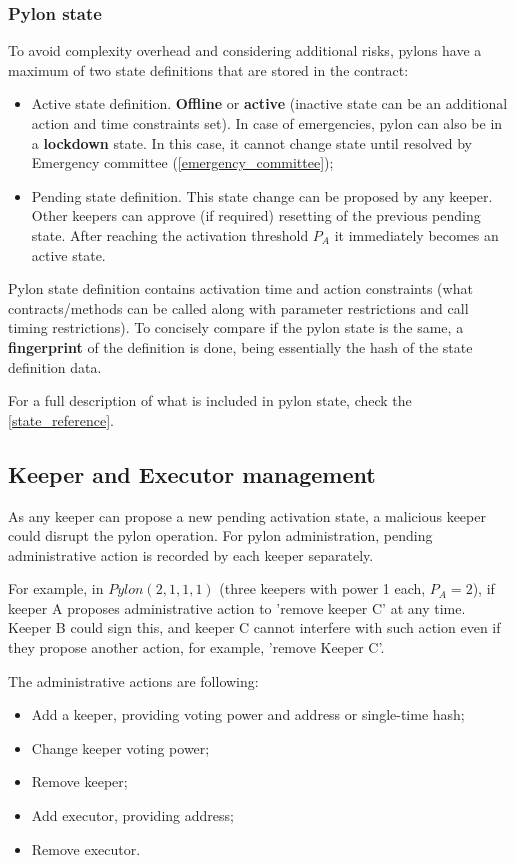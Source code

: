 \documentclass[12pt]{article}
\begin{document}
\subsubsection{Pylon state}

To avoid complexity overhead and considering additional risks, pylons have a maximum of two state definitions that are stored in the contract:
\begin{itemize}

\item{Active state definition. \textbf{Offline} or \textbf{active} (inactive state can be an additional action and time constraints set). In case of emergencies, pylon can also be in a \textbf{lockdown} state. In this case, it cannot change state until resolved by Emergency committee (\ref{emergency_committee});}
\item{Pending state definition. This state change can be proposed by any keeper. Other keepers can approve (if required) resetting of the previous pending state. After reaching the activation threshold $P_A$ it immediately becomes an active state.}
\end{itemize}

Pylon state definition contains activation time and action constraints (what contracts/methods can be called along with parameter restrictions and call timing restrictions). To concisely compare if the pylon state is the same, a \textbf{fingerprint} of the definition is done, being essentially the hash of the state definition data.

For a full description of what is included in pylon state, check the \ref{state_reference}.

\subsection{Keeper and Executor management}

As any keeper can propose a new pending activation state, a malicious keeper could disrupt the pylon operation. For pylon administration, pending administrative action is recorded by each keeper separately.

For example, in $Pylon(2, 1, 1, 1)$ (three keepers with power 1 each, $P_A = 2$), if keeper A proposes administrative action to 'remove keeper C' at any time. Keeper B could sign this, and keeper C cannot interfere with such action even if they propose another action, for example, 'remove Keeper C'.

The administrative actions are following:
\begin{itemize}
\item{Add a keeper, providing voting power and address or single-time hash;}
\item{Change keeper voting power;}
\item{Remove keeper;}
\item{Add executor, providing address;}
\item{Remove executor.}
\end{itemize}
\end{document}
